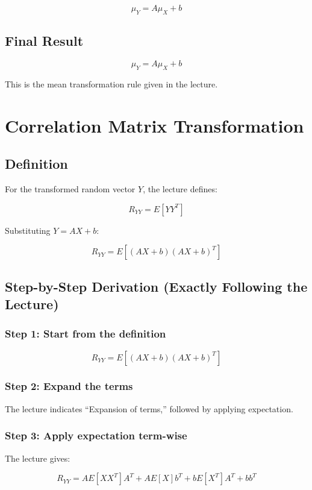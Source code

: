 \documentclass[12pt]{article}
\begin{document}
\[
\mu_Y = A\mu_X + b
\]

\subsection{Final Result}

\[
\boxed{\mu_Y = A\mu_X + b}
\]

This is the mean transformation rule given in the lecture.

\section{Correlation Matrix Transformation}

\subsection{Definition}

For the transformed random vector \(Y\), the lecture defines:

\[
R_{YY} = E[YY^T]
\]

Substituting \(Y = AX + b\):

\[
R_{YY} = E[(AX + b)(AX + b)^T]
\]

\subsection{Step-by-Step Derivation (Exactly Following the Lecture)}

\subsubsection*{Step 1: Start from the definition}

\[
R_{YY} = E[(AX + b)(AX + b)^T]
\]

\subsubsection*{Step 2: Expand the terms}

The lecture indicates ``Expansion of terms,'' followed by applying expectation.

\subsubsection*{Step 3: Apply expectation term-wise}

The lecture gives:

\[
R_{YY} = A E[XX^T] A^T + A E[X] b^T + b E[X^T] A^T + bb^T
\]
\end{document}
